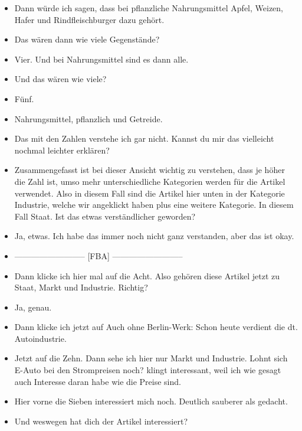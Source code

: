 {\begin{itemize}[]
        \item {} Dann würde ich sagen, dass bei pflanzliche Nahrungsmittel Apfel, Weizen, Hafer und Rindfleischburger dazu gehört.
        \item {} Das wären dann wie viele Gegenstände?
        \item {} Vier. Und bei Nahrungsmittel sind es dann alle.
        \item {} Und das wären wie viele?
        \item {} Fünf.
        \item {} Nahrungsmittel, pflanzlich und Getreide.
        \item {} Das mit den Zahlen verstehe ich gar nicht.
              Kannst du mir das vielleicht nochmal leichter erklären?
        \item {} Zusammengefasst ist bei dieser Ansicht wichtig zu verstehen, dass je höher die Zahl ist, umso mehr unterschiedliche Kategorien werden für die Artikel verwendet.
              Also in diesem Fall sind die Artikel hier unten in der Kategorie Industrie, welche wir angeklickt haben plus eine weitere Kategorie.
              In diesem Fall Staat.
              Ist das etwas verständlicher geworden?
        \item {} Ja, etwas.
              Ich habe das immer noch nicht ganz verstanden, aber das ist okay.
        \item {--------------------------} [FBA] {--------------------------}
        \item {} Dann klicke ich hier mal auf die Acht.
              Also gehören diese Artikel jetzt zu Staat, Markt und Industrie. Richtig?
        \item {} Ja, genau.
        \item {} Dann klicke ich jetzt auf \flqq Auch ohne Berlin-Werk: Schon heute verdient die dt. Autoindustrie\frqq{}.
        \item {} Jetzt auf die Zehn.
              Dann sehe ich hier nur Markt und Industrie.
              \flqq Lohnt sich E-Auto bei den Strompreisen noch?\frqq{} klingt interessant, weil ich wie gesagt auch Interesse daran habe wie die Preise sind.
        \item {} Hier vorne die Sieben interessiert mich noch.
              \flqq Deutlich sauberer als gedacht\frqq{}.
        \item {} Und weswegen hat dich der Artikel interessiert?

\end{itemize}}
